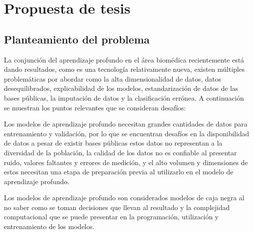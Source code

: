 \section{Propuesta de tesis}





\subsection{Planteamiento del problema}

La conjunción del aprendizaje profundo en el área biomédica recientemente está dando resultados, como es una tecnología relativamente nueva, existen múltiples problemáticas por abordar como la alta dimensionalidad de datos, datos desequilibrados, explicabilidad de los modelos, estandarización de datos de las bases públicas, la imputación de datos y la clasificación errónea. A continuación se muestran los puntos relevantes que se consideran desafíos:

Los modelos de aprendizaje profundo necesitan grandes cantidades de datos para entrenamiento y validación, por lo que se encuentran desafíos en la disponibilidad de datos a pesar de existir bases públicas estos datos no representan a la diversidad de la población, la calidad de los datos no es confiable al presentar ruido, valores faltantes y errores de medición, y el alto volumen y dimensiones de estos necesitan una etapa de preparación previa al utilizarlo en el modelo de aprendizaje profundo.

Los modelos de aprendizaje profundo son considerados modelos de caja negra al no saber como se toman decisiones que llevan al resultado y la complejidad computacional que se puede presentar en la programación, utilización y entrenamiento de los modelos.

